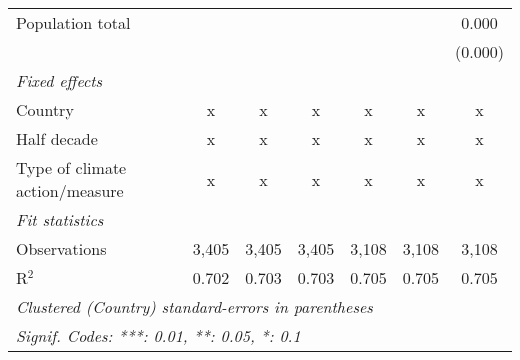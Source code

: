 \begin{tabular}{lcccccc}
   Population total                             &         &               &               &               &               & 0.000\\   
                                                &         &               &               &               &               & (0.000)\\   
   \emph{Fixed effects}\\
   Country                                      & x       & x             & x             & x             & x             & x\\  
   Half decade                                  & x       & x             & x             & x             & x             & x\\  
   Type of climate action/measure               & x       & x             & x             & x             & x             & x\\  
   \midrule \emph{Fit statistics}\\
   Observations                                 & 3,405   & 3,405         & 3,405         & 3,108         & 3,108         & 3,108\\  
   R$^2$                                        & 0.702   & 0.703         & 0.703         & 0.705         & 0.705         & 0.705\\  
   \midrule
   \multicolumn{7}{l}{\emph{Clustered (Country) standard-errors in parentheses}}\\
   \multicolumn{7}{l}{\emph{Signif. Codes: ***: 0.01, **: 0.05, *: 0.1}}\\
\end{tabular}
\par\endgroup


